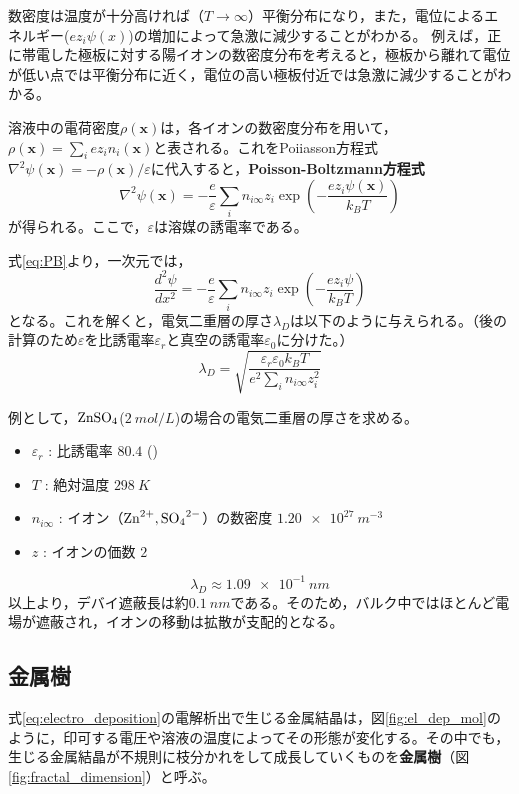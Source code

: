 \documentclass[autodetect-engine,dvi=dvipdfmx,a4paper,ja=standard,oneside,openany,11pt,draft]{bxjsbook}
\begin{document}
数密度は温度が十分高ければ（$T\to\infty$）平衡分布になり，また，電位によるエネルギー($ez_i\psi(x)$)の増加によって急激に減少することがわかる。
例えば，正に帯電した極板に対する陽イオンの数密度分布を考えると，極板から離れて電位が低い点では平衡分布に近く，電位の高い極板付近では急激に減少することがわかる。

溶液中の電荷密度$\rho(\bm{x})$は，各イオンの数密度分布を用いて，$\rho(\bm{x})=\sum_{i}ez_in_i(\bm{x})$と表される。これをPoiiasson方程式$\nabla^2\psi(\bm{x})=-\rho(\bm{x})/\varepsilon$に代入すると，\textbf{Poisson-Boltzmann方程式}
\begin{equation}
  \nabla^2\psi(\bm{x}) = -\frac{e}{\varepsilon}\sum_{i}n_{i\infty}z_i\exp(-\frac{ez_i\psi(\bm{x})}{k_BT})
  \label{eq:PB}
\end{equation}
が得られる。ここで，$\varepsilon$は溶媒の誘電率である。

式\eqref{eq:PB}より，一次元では，
\begin{equation}
  \frac{d^2\psi}{dx^2} = -\frac{e}{\varepsilon}\sum_{i}n_{i\infty}z_i\exp(-\frac{ez_i\psi}{k_BT})
  \label{eq:PB_1D}
\end{equation}
となる。これを解くと，電気二重層の厚さ$\lambda_D$は以下のように与えられる。（後の計算のため$\varepsilon$を比誘電率$\varepsilon_r$と真空の誘電率$\varepsilon_0$に分けた。）
\begin{equation}
  \lambda_D = \sqrt{\frac{\varepsilon_r\varepsilon_0 k_BT}{e^2\sum_{i}n_{i\infty}z_i^2}}\label{eq:debye_length}
\end{equation}

例として，$\ce{ZnSO_4}$($\SI{2}{mol/L}$)の場合の電気二重層の厚さを求める。
\begin{itemize}
  \item $\varepsilon_r$ : 比誘電率 $80.4$ ()
  \item $T$ : 絶対温度 $\SI{298}{K}$
  \item $n_{i\infty}$ : イオン（$\ce{Zn^{2+},SO_4^{2-}}$）の数密度 $\SI{1.20e27}{m^{-3}}$
  \item $z$ : イオンの価数 $2$
\end{itemize}
\begin{equation}
  \lambda_D\approx \SI{1.09e-1}{nm}
\end{equation}
以上より，デバイ遮蔽長は約$\SI{0.1}{nm}$である。そのため，バルク中ではほとんど電場が遮蔽され，イオンの移動は拡散が支配的となる。
\subsection{金属樹}
式\eqref{eq:electro_deposition}の電解析出で生じる金属結晶は，図\ref{fig:el_dep_mol}のように，印可する電圧や溶液の温度によってその形態が変化する\cite{suda2003temperature}。その中でも，生じる金属結晶が不規則に枝分かれをして成長していくものを\textbf{金属樹}（図\ref{fig:fractal_dimension}）と呼ぶ。
\end{document}
